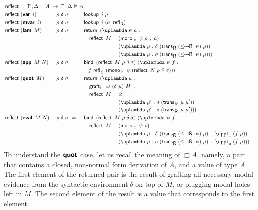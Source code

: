 \documentclass[submission,copyright,creativecommons,sharealike,backref=page]{eptcs}
\newcommand{\sigmas}{\rlap{$\sigma$}\hphantom{\delta}}
\newcommand{\R}{\mathrel{\rlap{$\mkern.75mu\textsf{R}$}\hphantom{\subseteq}}}
\renewcommand{\:}{\mathop{\mkern3mu:\mkern3mu}}
\renewcommand{\.}{\mathop{\mkern3mu.\mkern3mu}}
\renewcommand{\;}{\mathop{;}}
\renewcommand{\,}{\mathop{,}}
\newcommand{\unit}{\varnothing}
\newcommand{\e}{\mathrel{\mkern2mu\vdash\mkern1mu}}
\newcommand{\ee}{\mathrel{\mkern2mu\Vdash\mkern1mu}}
\newcommand{\ees}{\mathrel{\mkern2mu\Vdash_{\mkern-9mu\scriptscriptstyle{\star}}}}
\newcommand{\ef}{\mathrel{\mkern2mu\vDash\mkern1mu}}
\renewcommand{\r}{\mathrel{\rightarrow\mkern-1mu}}
\newcommand{\reflect}{\operatorname{\textsf{reflect}}}
\newcommand{\monoee}{\operatorname{\textsf{mono}_{\ee}}}
\newcommand{\monoees}{\operatorname{\textsf{mono}_{\ees}}}
\newcommand{\pii}{\operatorname{\uppi_{\scriptscriptstyle{1}}}}
\newcommand{\piii}{\operatorname{\uppi_{\scriptscriptstyle{2}}}}
\newcommand{\reflle}{\operatorname{\textsf{refl}_{\le}}}
\newcommand{\reflR}{\operatorname{\textsf{refl}_{\R}}}
\newcommand{\transR}{\operatorname{\textsf{trans}_{\R}}}
\newcommand{\lerR}{\operatorname{\le\mkern-1mu\r\mkern-1mu\R}}
\newcommand{\var}{\operatorname{\textsf{\textbf{var}}}}
\newcommand{\mvar}{\operatorname{\textsf{\textbf{mvar}}}}
\newcommand{\lam}{\operatorname{\textsf{\textbf{lam}}}}
\newcommand{\app}{\operatorname{\textsf{\textbf{app}}}}
\newcommand{\quot}{\operatorname{\textsf{\textbf{quot}}}}
\newcommand{\eval}{\operatorname{\textsf{\textbf{eval}}}}
\newcommand{\return}{\operatorname{\textsf{return}}}
\newcommand{\bind}{\operatorname{\textsf{bind}}}
\newcommand{\lookup}{\operatorname{\textsf{lookup}}}
\newcommand{\grafte}{\operatorname{\textsf{graft}_{\e}}}
\theoremstyle{mystyle}
\begin{document}
\begin{alignat*}{5}
  & \reflect ~\:~ \rlap{$\Gamma \; \Delta \e A ~\r~ \Gamma \; \Delta \ef A$}\\
  & \reflect~(\var~i)    && ~\rho~\delta~\sigma ~=~ && \lookup~\rlap{$i~\rho$}\\
  & \reflect~(\mvar~i)   && ~\rho~\delta~\sigma ~=~ && \lookup~\rlap{$i~(\sigma~\reflR)$}\\
  & \reflect~(\lam~M)    && ~\rho~\delta~\sigma ~=~ && \return~\rlap{$(\uplambda~\psi~a \.$}\\
  &                      &&                         && \quad \reflect~M~ &&(\monoees~\psi~\rho~\,~a)\\
  &                      &&                         &&                   &&(\uplambda~\mu \. \delta~(\transR~(\lerR~\psi)~\mu))\\
  &                      &&                         &&                   &&(\uplambda~\mu \. \sigmas~(\transR~(\lerR~\psi)~\mu)))\\
  & \reflect~(\app~M~N)  && ~\rho~\delta~\sigma ~=~ && \bind~\rlap{$(\reflect~M~\rho~\delta~\sigma)~(\uplambda~\psi~f \.$}\\
  &                      &&                          && \quad f~\rlap{$\reflle~(\monoee~\psi~(\reflect~N~\rho~\delta~\sigma)))$}\\
  & \reflect~(\quot~M)   && ~\rho~\delta~\sigma ~=~ && \return~\rlap{$(\uplambda~\mu \.$}\\
  &                      &&                         && \quad \grafte~\rlap{$\unit~(\delta~\mu)~M~\,$}\\
  &                      &&                         && \quad \reflect~M~ &&\unit\\                                
  &                      &&                         &&                   &&(\uplambda~\mu' \. \delta~(\transR~\mu~\mu'))\\
  &                      &&                         &&                   &&(\uplambda~\mu' \. \sigmas~(\transR~\mu~\mu')))\\
  & \reflect~(\eval~M~N) && ~\rho~\delta~\sigma ~=~ && \bind~\rlap{$(\reflect~M~\rho~\delta~\sigma)~(\uplambda~\psi~f \.$}\\
  &                      &&                         && \quad \reflect~M~ &&(\monoees~\psi~\rho)\\
  &                      &&                         &&                   &&(\uplambda~\mu \. \delta~(\transR~(\lerR~\psi)~\mu)~\,~\pii~(f~\mu))\\
  &                      &&                         &&                   &&(\uplambda~\mu \. \sigmas~(\transR~(\lerR~\psi)~\mu)~\,~\piii~(f~\mu)))
\end{alignat*}
To understand the $\quot$ case, let us recall the meaning of $\Box A$, namely, a pair that contains a closed, non-normal form derivation of $A$, and a value of type $A$.  The first element of the returned pair is the result of grafting all necessary modal evidence from the syntactic environment $\delta$ on top of $M$, or plugging modal holes left in $M$.  The second element of the result is a value that corresponds to the first element. 
\end{document}

